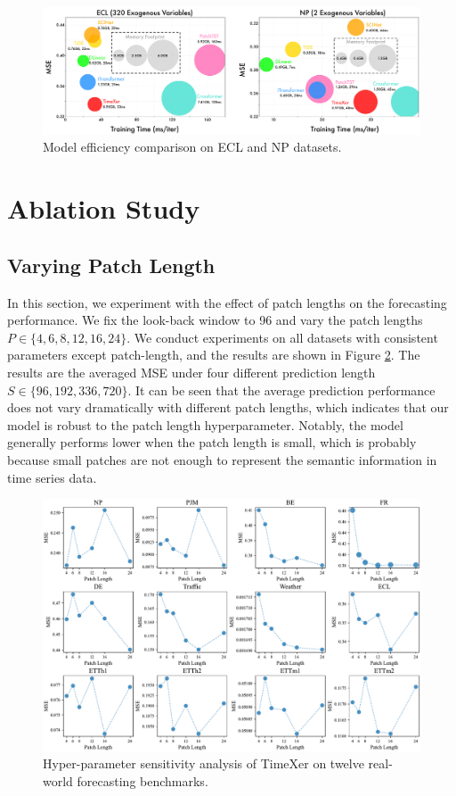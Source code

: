 \documentclass[nohyperref]{article}
\theoremstyle{plain}
\theoremstyle{definition}
\theoremstyle{remark}
\begin{document}
\begin{figure}[h]
    \centering
    \includegraphics[width=0.8\linewidth]{fig/efficiencyv2.pdf}
    \caption{Model efficiency comparison on ECL and NP datasets.}
    \vspace{-20pt}
    \label{fig:enter-label}
\end{figure}



\section{Ablation Study}
\subsection{Varying Patch Length}
In this section, we experiment with the effect of patch lengths on the forecasting performance. We fix the look-back window to 96 and vary the patch lengths $P \in \{4, 6, 8, 12, 16, 24\}$. We conduct experiments on all datasets with consistent parameters except patch-length, and the results are shown in Figure \ref{fig:patch-len}. The results are the averaged MSE under four different prediction length $S \in \{96, 192, 336, 720\}$. It can be seen that the average prediction performance does not vary dramatically with different patch lengths, which indicates that our model is robust to the patch length hyperparameter. Notably, the model generally performs lower when the patch length is small, which is probably because small patches are not enough to represent the semantic information in time series data.


\begin{figure}[h]
    \centering
    \includegraphics[width=\linewidth]{fig/patch-len.pdf}
    \vspace{-5px}
    \caption{Hyper-parameter sensitivity analysis of TimeXer on twelve real-world forecasting benchmarks.}
    \label{fig:patch-len}
\end{figure}
\end{document}

